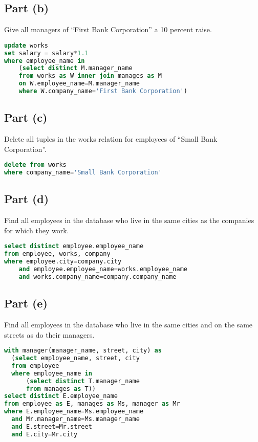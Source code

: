 \documentclass{article}
\begin{document}
\subsection{Part (b)}
Give all managers of “First Bank Corporation” a 10 percent raise.
\begin{lstlisting}[language=sql]
update works
set salary = salary*1.1
where employee_name in 
    (select distinct M.manager_name
    from works as W inner join manages as M
    on W.employee_name=M.manager_name
    where W.company_name='First Bank Corporation')
\end{lstlisting}

\subsection{Part (c)}
Delete all tuples in the works relation for employees of “Small Bank Corporation”.
\begin{lstlisting}[language=sql]
delete from works
where company_name='Small Bank Corporation'
\end{lstlisting}

\subsection{Part (d)}
Find all employees in the database who live in the same cities as the companies for which they work.
\begin{lstlisting}[language=sql]
select distinct employee.employee_name
from employee, works, company
where employee.city=company.city
    and employee.employee_name=works.employee_name
    and works.company_name=company.company_name
\end{lstlisting}

\newpage
\subsection{Part (e)}
Find all employees in the database who live in the same cities and on the same streets as do their
managers.
\begin{lstlisting}[language=sql]
with manager(manager_name, street, city) as
  (select employee_name, street, city
  from employee
  where employee_name in
      (select distinct T.manager_name
      from manages as T))
select distinct E.employee_name
from employee as E, manages as Ms, manager as Mr
where E.employee_name=Ms.employee_name
  and Mr.manager_name=Ms.manager_name
  and E.street=Mr.street
  and E.city=Mr.city
\end{lstlisting}
\end{document}
